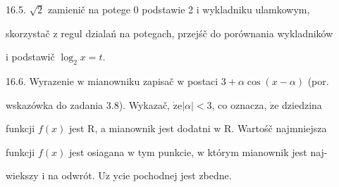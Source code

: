 \documentclass[a4paper,12pt]{article}
\begin{document}
16.5. $\sqrt{2}$ zamienič na potege $0$ podstawie 2 $\mathrm{i}$ wykladniku ulamkowym,

skorzystač $\mathrm{z}$ regul dzialań na potegach, przejśč do porównania wykladników

$\mathrm{i}$ podstawič $\log_{2}x=t.$

16.6. Wyrazenie $\mathrm{w}$ mianowniku zapisač $\mathrm{w}$ postaci $3+\alpha\cos(x-\alpha)$ (por.

wskazówka do zadania 3.8). Wykazač, $\dot{\mathrm{z}}\mathrm{e} |\alpha| <3$, co oznacza, $\dot{\mathrm{z}}\mathrm{e}$ dziedzina

funkcji $f(x)$ jest $\mathrm{R}$, a mianownik jest dodatni $\mathrm{w}$ R. Wartośč najmniejsza

funkcji $f(x)$ jest osiagana $\mathrm{w}$ tym punkcie, $\mathrm{w}$ którym mianownik jest naj-

wiekszy $\mathrm{i}$ na odwrót. $\mathrm{U}\dot{\mathrm{z}}$ ycie pochodnej jest zbedne.
\end{document}
